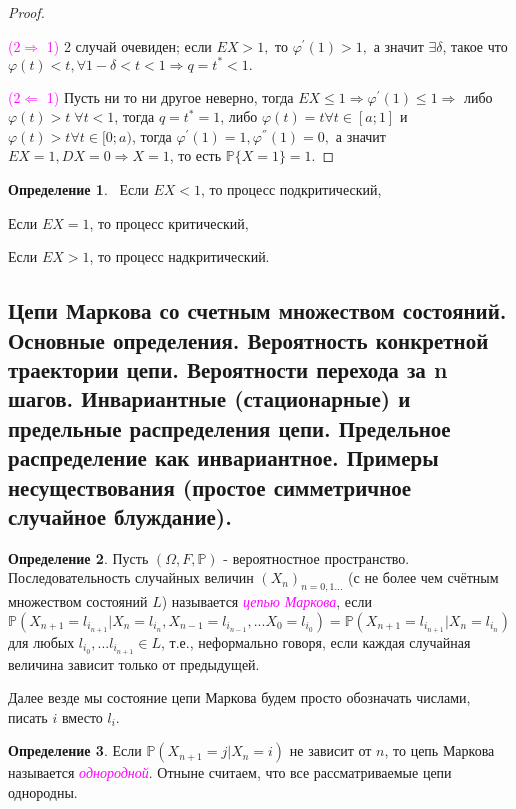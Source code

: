 \documentclass[a4paper,100pt]{article}
\theoremstyle{indented}
\theoremstyle{definition}
\newtheorem{defn}{Определение}
\theoremstyle{remark}
\begin{document}
\begin{proof} \

        \textcolor{magenta}{($2 \Rightarrow$ 1)} 2 случай очевиден; если $EX>1,$ то $\varphi^{'}(1) > 1,$ а значит $\exists \delta$, такое что $\varphi(t) < t, \forall 1 - \delta < t < 1 \Rightarrow q = t^{*} < 1.$
        
        \textcolor{magenta}{($2 \Leftarrow$ 1)} Пусть ни то ни другое неверно, тогда $EX \leq 1 \Rightarrow \varphi^{'}(1) \leq 1 \Rightarrow$ либо $\varphi(t) > t \; \forall t < 1$, тогда $q = t^{*} = 1$, либо $\varphi(t) = t \forall t \in [a;1]$ и $\varphi(t) > t \forall t \in [0;a)$, тогда $\varphi^{'}(1) = 1, \varphi^{''}(1) = 0,$ а значит $EX = 1, DX = 0 \Rightarrow X = 1$, то есть $\mathbb P \{X = 1\} = 1$.
\end{proof}

\begin{defn} 
  \ 
    Если $EX < 1$, то процесс подкритический, \
    
    Если $EX = 1$, то процесс критический, \
    
    Если $EX > 1$, то процесс надкритический.
\end{defn}

\subsection{Цепи Маркова со счетным множеством состояний. Основные определения. Вероятность конкретной траектории цепи. Вероятности перехода за n шагов. Инвариантные (стационарные) и предельные распределения цепи. Предельное распределение как инвариантное. Примеры несуществования (простое симметричное случайное блуждание).}

\begin{defn}
Пусть $(\Omega, F, \mathbb{P})$ - вероятностное пространство. Последовательность случайных величин $(X_n)_{n=0, 1...}$ (с не более чем счётным множеством состояний $L$) называется \hypertarget{n29}{\textcolor{magenta}{\textit{цепью Маркова}}}, если $\mathbb{P}(X_{n+1}=l_{i_{n+1}} | X_n=l_{i_n}, X_{n-1}=l_{i_{n-1}}, ... X_0=l_{i_0})= \mathbb{P}(X_{n+1}=l_{i_{n+1}} | X_n=l_{i_n})$ для любых $l_{i_0}, ... l_{i_{n+1}} \in L$, т.е., неформально говоря, если каждая случайная величина зависит только от предыдущей.
\end{defn} 

Далее везде мы состояние цепи Маркова будем просто обозначать числами, писать $i$ вместо $l_i$.

\begin{defn}
Если $\mathbb{P}(X_{n+1}=j | X_n=i)$ не зависит от $n$, то цепь Маркова называется \hypertarget{n30}{\textcolor{magenta}{\textit{однородной}}}. Отныне считаем, что все рассматриваемые цепи однородны.
\end{defn}
\end{document}
